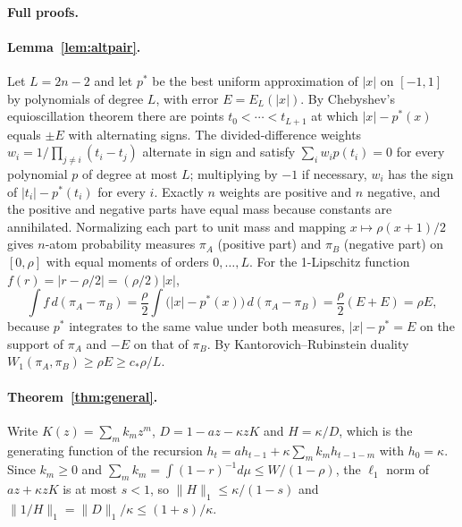 \documentclass[12pt]{article}
\theoremstyle{definition}
\theoremstyle{remark}
\begin{document}
\paragraph{Full proofs.}

\paragraph{Lemma~\ref{lem:altpair}.} Let $L=2n-2$ and let $p^*$ be the best uniform approximation of $|x|$ on $[-1,1]$ by polynomials of degree $L$, with error $E=E_L(|x|)$. By Chebyshev's equioscillation theorem \citep{rivlin1981} there are points $t_0<\cdots<t_{L+1}$ at which $|x|-p^*(x)$ equals $\pm E$ with alternating signs. The divided-difference weights $w_i=1/\prod_{j\ne i}(t_i-t_j)$ alternate in sign and satisfy $\sum_iw_ip(t_i)=0$ for every polynomial $p$ of degree at most $L$; multiplying by $-1$ if necessary, $w_i$ has the sign of $|t_i|-p^*(t_i)$ for every $i$. Exactly $n$ weights are positive and $n$ negative, and the positive and negative parts have equal mass because constants are annihilated. Normalizing each part to unit mass and mapping $x\mapsto\rho(x+1)/2$ gives $n$-atom probability measures $\pi_A$ (positive part) and $\pi_B$ (negative part) on $[0,\rho]$ with equal moments of orders $0,\ldots,L$. For the 1-Lipschitz function $f(r)=|r-\rho/2|=(\rho/2)|x|$,
\[
\int f\,d(\pi_A-\pi_B)=\frac\rho2\int\bigl(|x|-p^*(x)\bigr)\,d(\pi_A-\pi_B)=\frac\rho2(E+E)=\rho E ,
\]
because $p^*$ integrates to the same value under both measures, $|x|-p^*=E$ on the support of $\pi_A$ and $-E$ on that of $\pi_B$. By Kantorovich--Rubinstein duality $W_1(\pi_A,\pi_B)\ge\rho E\ge c_*\rho/L$.


\paragraph{Theorem~\ref{thm:general}.} Write $K(z)=\sum_mk_mz^m$, $D=1-az-\kappa zK$ and $H=\kappa/D$, which is the generating function of the recursion $h_t=ah_{t-1}+\kappa\sum_mk_mh_{t-1-m}$ with $h_0=\kappa$. Since $k_m\ge0$ and $\sum_mk_m=\int(1-r)^{-1}d\mu\le W/(1-\rho)$, the $\ell_1$ norm of $az+\kappa zK$ is at most $s<1$, so $\|H\|_1\le\kappa/(1-s)$ and $\|1/H\|_1=\|D\|_1/\kappa\le(1+s)/\kappa$.
\end{document}
